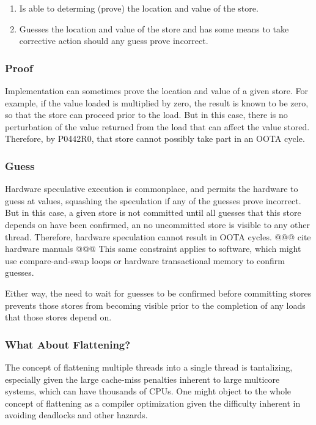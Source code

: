 \documentclass[10]{article}
\begin{document}
\begin{enumerate}
\item	Is able to determing (prove) the location and value of the store.
\item	Guesses the location and value of the store and has some means
	to take corrective action should any guess prove incorrect.
\end{enumerate}

\subsubsection{Proof}
\label{sec:Proof}

Implementation can sometimes prove the location and value of a given
store.
For example, if the value loaded is multiplied by zero, the result
is known to be zero, so that the store can proceed prior to the load.
But in this case, there is no perturbation of the value returned from
the load that can affect the value stored.
Therefore, by P0442R0, that store cannot possibly take part in an
OOTA cycle.

\subsubsection{Guess}
\label{sec:Guess}

Hardware speculative execution is commonplace, and permits the
hardware to guess at values, squashing the speculation if any
of the guesses prove incorrect.
But in this case, a given store is not committed until all guesses that
this store depends on have been confirmed, an no uncommitted store
is visible to any other thread.
Therefore, hardware speculation cannot result in OOTA cycles.
@@@ cite hardware manuals @@@
This same constraint applies to software, which might use compare-and-swap
loops or hardware transactional memory to confirm guesses.

Either way, the need to wait for guesses to be confirmed before committing
stores prevents those stores from becoming visible prior to the
completion of any loads that those stores depend on.

\subsubsection{What About Flattening?}
\label{sec:What About Flattening?}

The concept of flattening multiple threads into a single thread is
tantalizing, especially given the large cache-miss penalties inherent
to large multicore systems, which can have thousands of CPUs.
One might object to the whole concept of flattening as a compiler
optimization given the difficulty inherent in avoiding deadlocks
and other hazards.
\end{document}
